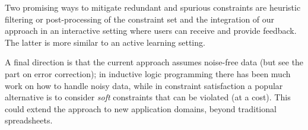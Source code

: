 Two promising ways to mitigate redundant and spurious constraints are heuristic filtering or post-processing of the constraint set and the integration of our approach in an interactive setting where users can receive and provide feedback.
The latter is more similar to an active learning setting.

A final direction is that the current approach assumes noise-free data (but see the part on error correction); in inductive logic programming there has been much work on how to handle noisy data, while in constraint satisfaction a popular alternative is to consider \textit{soft} constraints that can be violated (at a cost). 
This could extend the approach to new application domains, beyond traditional spreadsheets.



{
  }

